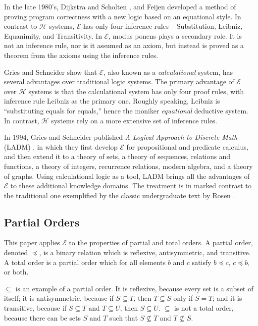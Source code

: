 \documentclass[12pt, fleqn, leqno]{article}
\begin{document}
In the late 1980's, Dijkstra and Scholten \cite{DandS}, and Feijen \cite{Feij} developed a method of proving program correctness with a new logic based on an equational style.
In contrast to $\mathcal{H}$ systems, $\mathcal{E}$ has only four inference rules -- Substitution, Leibniz, Equanimity, and Transitivity.
In $\mathcal{E}$, modus ponens plays a secondary role.
It is not an inference rule, nor is it assumed as an axiom, but instead is proved as a theorem from the axioms using the inference rules.

Gries and Schneider \cite{Gries1995, Gries1995145} show that $\mathcal{E}$, also known as a \textit{calculational} system, has several advantages over traditional logic systems.
The primary advantage of $\mathcal{E}$ over $\mathcal{H}$ systems is that the calculational system has only four proof rules, with inference rule Leibniz as the primary one.
Roughly speaking, Leibniz is ``substituting equals for equals,'' hence the moniker \textit{equational} deductive system.
In contrast, $\mathcal{H}$ systems rely on a more extensive set of inference rules.

In 1994, Gries and Schneider published \textit{A Logical Approach to Discrete Math} (LADM) \cite{LADM}, in which they first develop $\mathcal{E}$ for propositional and predicate calculus, and then extend it to a theory of sets, a theory of sequences, relations and functions, a theory of integers, recurrence relations, modern algebra, and a theory of graphs.
Using calculational logic as a tool, LADM brings all the advantages of $\mathcal{E}$ to these additional knowledge domains.
The treatment is in marked contrast to the traditional one exemplified by the classic undergraduate text by Rosen \cite{Rosen}.

\subsection{Partial Orders}

This paper applies $\mathcal{E}$ to the properties of partial and total orders.
A partial order, denoted $\preceq$, is a binary relation which is reflexive, antisymmetric, and transitive.
A total order is a partial order which for all elements $b$ and $c$ satisfy $b \preceq c$, $c \preceq b$, or both.

$\subseteq$ is an example of a partial order.
It is reflexive, because every set is a subset of itself; it is antisymmetric, because if $S \subseteq T$, then $T \subseteq S$ only if $S=T$; and it is transitive, because if $S \subseteq T$ and $T \subseteq U$, then $S \subseteq U$.
$\subseteq$ is not a total order, because there can be sets $S$ and $T$ such that $S \nsubseteq T$ and $T \nsubseteq S$.
\end{document}
